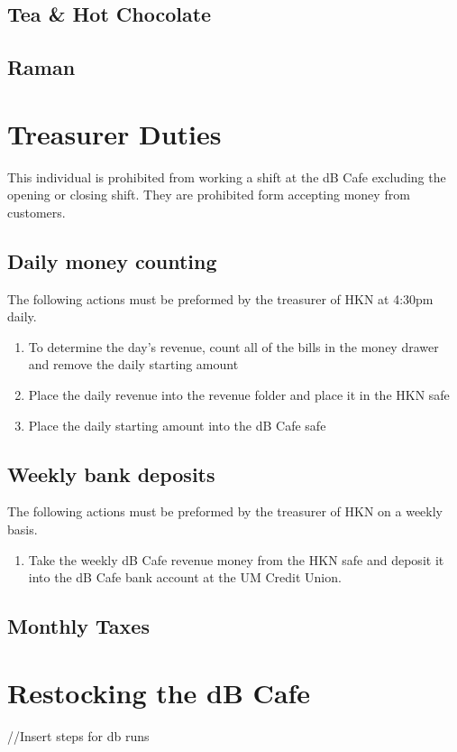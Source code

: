 \documentclass[12pt,onecolumn,letterpaper]{article}
\begin{document}
\subsection{Tea \& Hot Chocolate}
\subsection{Raman}

\section{Treasurer Duties}
This individual is prohibited from working a shift at the dB Cafe excluding the opening or closing shift. They are prohibited form accepting money from customers. 
\subsection{Daily money counting}
The following actions must be preformed by the treasurer of HKN at 4:30pm daily. 
\begin{enumerate}
\item To determine the day's revenue, count all of the bills in the money drawer and remove the daily starting amount
\item Place the daily revenue into the revenue folder and place it in the HKN safe
\item Place the daily starting amount into the dB Cafe safe
\end{enumerate}
\subsection{Weekly bank deposits}
The following actions must be preformed by the treasurer of HKN on a weekly basis.
\begin{enumerate}
\item Take the weekly dB Cafe revenue money from the HKN safe and deposit it into the dB Cafe bank account at the UM Credit Union.
\end{enumerate}

\subsection{Monthly Taxes}

\section{Restocking the dB Cafe}
//Insert steps for db runs
\end{document}
